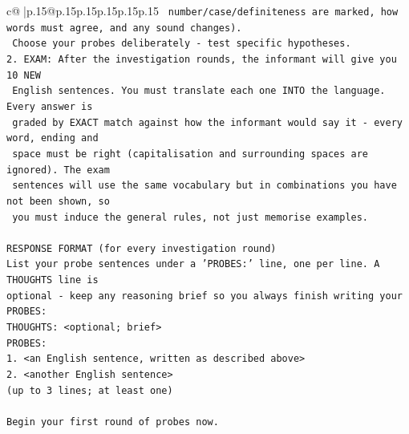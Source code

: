 \documentclass{article}
\begin{document}
{\begin{supertabular}{c@{$\;$}|p{.15\linewidth}@{}p{.15\linewidth}p{.15\linewidth}p{.15\linewidth}p{.15\linewidth}p{.15\linewidth}}
{{{\texttt{   number/case/definiteness are marked, how words must agree, and any sound changes).} \\
\texttt{   Choose your probes deliberately {-} test specific hypotheses.} \\
\texttt{2. EXAM: After the investigation rounds, the informant will give you 10 NEW} \\
\texttt{   English sentences. You must translate each one INTO the language. Every answer is} \\
\texttt{   graded by EXACT match against how the informant would say it {-} every word, ending and} \\
\texttt{   space must be right (capitalisation and surrounding spaces are ignored). The exam} \\
\texttt{   sentences will use the same vocabulary but in combinations you have not been shown, so} \\
\texttt{   you must induce the general rules, not just memorise examples.} \\
\\ 
\texttt{RESPONSE FORMAT (for every investigation round)} \\
\texttt{List your probe sentences under a 'PROBES:' line, one per line. A THOUGHTS line is} \\
\texttt{optional {-} keep any reasoning brief so you always finish writing your PROBES:} \\
\texttt{THOUGHTS: <optional; brief>} \\
\texttt{PROBES:} \\
\texttt{1. <an English sentence, written as described above>} \\
\texttt{2. <another English sentence>} \\
\texttt{(up to 3 lines; at least one)} \\
\\ 
\texttt{Begin your first round of probes now.} \\
            }
        }
    }
     \\ \\


\end{supertabular}}
\end{document}

